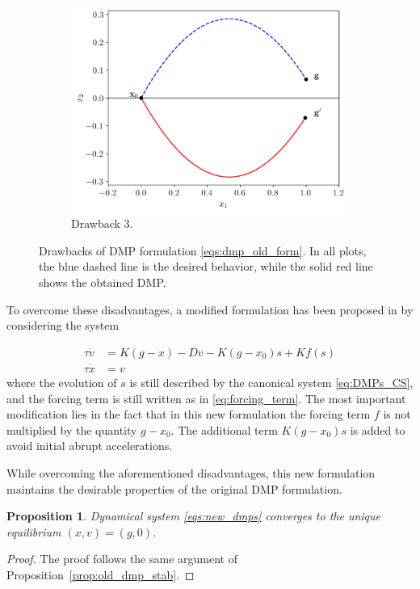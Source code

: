 \documentclass[fleqn, 11pt]{article}
\theoremstyle{definition}
\theoremstyle{plain}
\newtheorem{prop}{Proposition}[section]
\theoremstyle{remark}
\begin{document}
\begin{figure}
\begin{subfigure}{0.3\linewidth}
        \includegraphics[width=\textwidth]{imgs/old_problem_3.png}
        \caption{Drawback 3.}
    \end{subfigure}
    \caption{Drawbacks of DMP formulation \eqref{eqs:dmp_old_form}.
    In all plots, the blue dashed line is the desired behavior, while the solid red line shows the obtained DMP.}
    \label{fig:dmp_draw}
\end{figure}

To overcome these disadvantages, a modified formulation has been proposed in \cite{PHPS08, PHAS09, HPPS09} by considering the system

\begin{subequations}
    \label{eqs:new_dmps}
    \begin{align}
        \tau \dot{v} & = K (g - x) - Dv - K(g - x_0)s + Kf(s) \label{eq:new_dmps_acc}\\
        \tau \dot{x} & = v
    \end{align}
\end{subequations}
where the evolution of $s$ is still described by the canonical system \eqref{eq:DMPs_CS}, and the forcing term is still written as in \eqref{eq:forcing_term}.
The most important modification lies in the fact that in this new formulation the forcing term $f$ is not multiplied by the quantity $g - x_0$.
The additional term $ K(g - x_0)s $ is added to avoid initial abrupt accelerations.

While overcoming the aforementioned disadvantages, this new formulation maintains the desirable properties of the original DMP formulation.

\begin{prop}\label{prop:new_dmp_stab}
    Dynamical system \eqref{eqs:new_dmps} converges to the unique equilibrium $ (x, v) = (g, 0) $.
\end{prop}
\begin{proof}
    The proof follows the same argument of Proposition~\ref{prop:old_dmp_stab}.
\end{proof}
\end{document}
